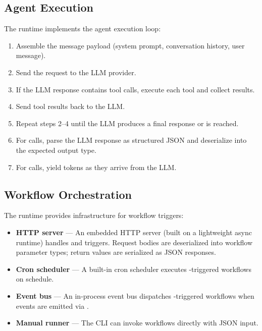 \subsection{Agent Execution}

The runtime implements the agent execution loop:

\begin{enumerate}
    \item Assemble the message payload (system prompt, conversation history, user message).
    \item Send the request to the LLM provider.
    \item If the LLM response contains tool calls, execute each tool and collect results.
    \item Send tool results back to the LLM.
    \item Repeat steps 2--4 until the LLM produces a final response or  is reached.
    \item For  calls, parse the LLM response as structured JSON and deserialize into the expected output type.
    \item For  calls, yield tokens as they arrive from the LLM.
\end{enumerate}

\subsection{Workflow Orchestration}

The runtime provides infrastructure for workflow triggers:

\begin{itemize}
    \item \textbf{HTTP server} --- An embedded HTTP server (built on a lightweight async runtime) handles  and  triggers. Request bodies are deserialized into workflow parameter types; return values are serialized as JSON responses.
    \item \textbf{Cron scheduler} --- A built-in cron scheduler executes -triggered workflows on schedule.
    \item \textbf{Event bus} --- An in-process event bus dispatches -triggered workflows when events are emitted via .
    \item \textbf{Manual runner} --- The CLI can invoke  workflows directly with JSON input.
\end{itemize}

